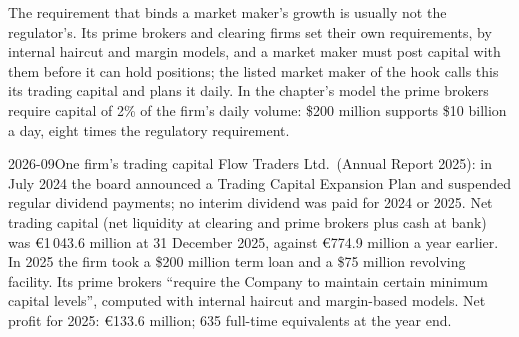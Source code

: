 \begin{omfigure}

\label{fig:fm:the-proprietary-market-making-firm:capital}
\end{omfigure}

The requirement that binds a market maker's growth is usually not the regulator's. Its prime brokers and clearing firms set their own
requirements, by internal haircut and margin models, and a market maker must post capital with them before it can hold positions; the listed
market maker of the hook calls this its trading capital and plans it daily. In the chapter's model the prime brokers require capital of 2\% of
the firm's daily volume: \$200 million supports \$10 billion a day, eight times the regulatory requirement.

\begin{dated}{2026-09}{One firm's trading capital}\label{dat:fm:the-proprietary-market-making-firm:flow}
Flow Traders Ltd.\ (Annual Report 2025): in July 2024 the board announced a Trading Capital Expansion Plan and suspended regular dividend
payments; no interim dividend was paid for 2024 or 2025. Net trading capital (net liquidity at clearing and prime brokers plus cash at bank)
was \euro1\,043.6 million at 31 December 2025, against \euro774.9 million a year earlier. In 2025 the firm took a \$200 million term loan and a \$75
million revolving facility. Its prime brokers ``require the Company to maintain certain minimum capital levels'', computed with internal haircut
and margin-based models. Net profit for 2025: \euro133.6 million; 635 full-time equivalents at the year end.
\end{dated}

